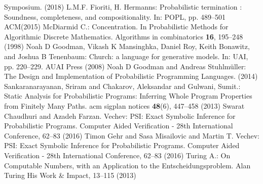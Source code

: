 \documentclass[runningheads]{llncs}
\begin{document}
\begin{thebibliography}{8}
Symposium. (2018)
L.M.F. Fioriti, H. Hermanns: Probabilistic termination : Soundness, completeness, and compositionality. In: POPL, pp. 489--501 ACM(2015)
McDiarmid C.: Concentration. In Probabilistic Methods for Algorithmic Discrete Mathematics. Algorithms in combinatorics \textbf{16}, 195--248 (1998)
Noah D Goodman, Vikash K Mansinghka, Daniel Roy, Keith Bonawitz, and Joshua B Tenenbaum: Church: a language for generative models. In: UAI, pp. 220--229. AUAI Press (2008)
Noah D Goodman and Andreas Stuhlmüller: The Design and
Implementation of Probabilistic Programming Languages. (2014)
Sankaranarayanan, Sriram and Chakarov, Aleksandar and Gulwani, Sumit.: Static Analysis for Probabilistic Programs: Inferring Whole Program Properties from Finitely Many Paths. acm sigplan notices \textbf{48}(6), 447--458 (2013)
Swarat Chaudhuri and Azadeh Farzan. Vechev: {PSI:} Exact Symbolic Inference for Probabilistic Programs. Computer Aided Verification - 28th International Conference, 62--83 (2016)
Timon Gehr and Sasa Misailovic and Martin T. Vechev: {PSI:} Exact Symbolic Inference for Probabilistic Programs. Computer Aided Verification - 28th International Conference, 62--83 (2016)
Turing A.: On Computable Numbers, with an Application to the Entscheidungsproblem. Alan Turing His Work \& Impact, 13--115 (2013)

\end{thebibliography}
\end{document}
